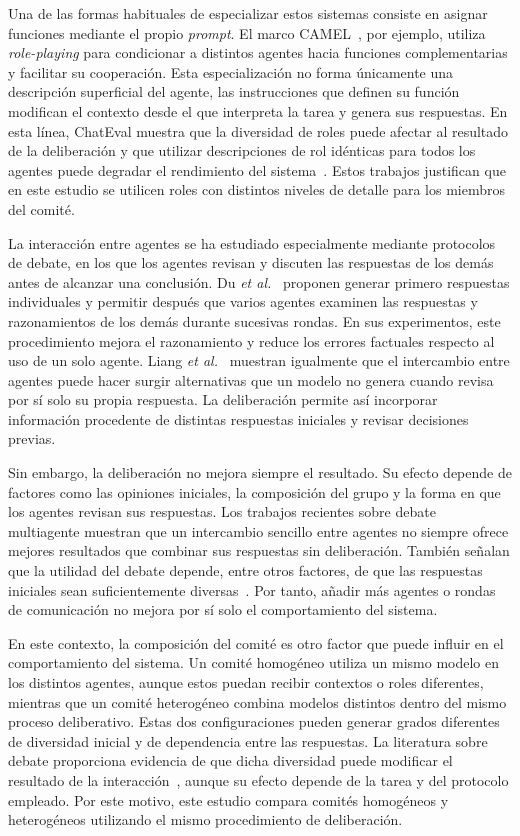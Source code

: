 Una de las formas habituales de especializar estos sistemas consiste en asignar funciones mediante el propio \textit{prompt}. El marco CAMEL~\cite{li2023camel}, por ejemplo, utiliza \textit{role-playing} para condicionar a distintos agentes hacia funciones complementarias y facilitar su cooperación. Esta especialización no forma únicamente una descripción superficial del agente, las instrucciones que definen su función modifican el contexto desde el que interpreta la tarea y genera sus respuestas. En esta línea, ChatEval muestra que la diversidad de roles puede
afectar al resultado de la deliberación y que utilizar descripciones de rol idénticas para todos los agentes puede degradar el rendimiento del sistema~\cite{chan2024chateval}. Estos trabajos justifican que en este estudio se utilicen roles con distintos niveles de detalle para los miembros del comité.

La interacción entre agentes se ha estudiado especialmente mediante protocolos de debate, en los que los agentes revisan y discuten las respuestas de los demás antes de alcanzar una conclusión. Du \textit{et al.}~\cite{du2023improving} proponen generar primero respuestas individuales y permitir después que varios agentes examinen las respuestas y razonamientos de los demás durante sucesivas rondas. En sus experimentos, este procedimiento mejora el razonamiento y reduce los errores factuales respecto al uso de un solo agente. Liang \textit{et al.}~\cite{liang2024encouraging} muestran igualmente que el intercambio entre agentes puede hacer surgir alternativas que un modelo no genera cuando revisa por sí solo su propia respuesta. La deliberación permite así incorporar información procedente de distintas respuestas iniciales y revisar decisiones previas.

Sin embargo, la deliberación no mejora siempre el resultado. Su efecto depende de factores como las opiniones iniciales, la composición del grupo y la forma en que los agentes revisan sus respuestas. Los trabajos recientes sobre debate multiagente muestran que un intercambio sencillo entre agentes no siempre ofrece mejores resultados que combinar sus respuestas sin deliberación. También señalan que la utilidad del debate depende, entre otros factores, de que las respuestas iniciales sean suficientemente diversas~\cite{zhu2026demystifying}. Por tanto, añadir más agentes o rondas de comunicación no mejora por sí solo el comportamiento del sistema.

En este contexto, la composición del comité es otro factor que puede influir en el comportamiento del sistema. Un comité homogéneo utiliza un mismo modelo en los distintos agentes, aunque estos puedan recibir contextos o roles diferentes, mientras que un comité heterogéneo combina modelos distintos dentro del mismo proceso deliberativo. Estas dos configuraciones pueden generar grados diferentes de diversidad inicial y de dependencia entre las respuestas. La literatura sobre debate proporciona evidencia de que dicha diversidad puede modificar el resultado de la interacción~\cite{chan2024chateval,zhu2026demystifying}, aunque su efecto depende de la tarea y del protocolo empleado. Por este motivo, este estudio compara comités homogéneos y heterogéneos utilizando el mismo procedimiento de deliberación.

